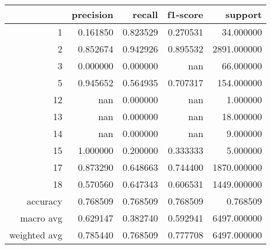 \begin{tabular}{rrrrr}
\toprule
 & precision & recall & f1-score & support \\
\midrule
1 & 0.161850 & 0.823529 & 0.270531 & 34.000000 \\
2 & 0.852674 & 0.942926 & 0.895532 & 2891.000000 \\
3 & 0.000000 & 0.000000 & nan & 66.000000 \\
5 & 0.945652 & 0.564935 & 0.707317 & 154.000000 \\
12 & nan & 0.000000 & nan & 1.000000 \\
13 & nan & 0.000000 & nan & 18.000000 \\
14 & nan & 0.000000 & nan & 9.000000 \\
15 & 1.000000 & 0.200000 & 0.333333 & 5.000000 \\
17 & 0.873290 & 0.648663 & 0.744400 & 1870.000000 \\
18 & 0.570560 & 0.647343 & 0.606531 & 1449.000000 \\
accuracy & 0.768509 & 0.768509 & 0.768509 & 0.768509 \\
macro avg & 0.629147 & 0.382740 & 0.592941 & 6497.000000 \\
weighted avg & 0.785440 & 0.768509 & 0.777708 & 6497.000000 \\
\bottomrule
\end{tabular}
